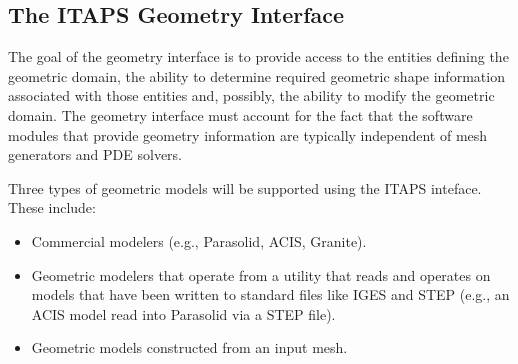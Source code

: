 \subsection{The ITAPS Geometry Interface}
\label{sec:geom}

The goal of the geometry interface is to provide access to the
entities defining the geometric domain, the ability to determine
required geometric shape information associated with those entities
and, possibly, the ability to modify the geometric domain. The
geometry interface must account for the fact that the software modules
that provide geometry information are typically independent of 
mesh generators and PDE solvers.



Three types of geometric models will be supported using the 
ITAPS inteface.  These include:

\begin{itemize}
\item Commercial modelers (e.g., Parasolid, ACIS, Granite).

\item Geometric modelers that operate from a utility that reads and operates on models that 
have been written to standard files like IGES and STEP (e.g., an ACIS
model read into Parasolid via a STEP file).

\item Geometric models constructed from an input mesh.
\end{itemize}

